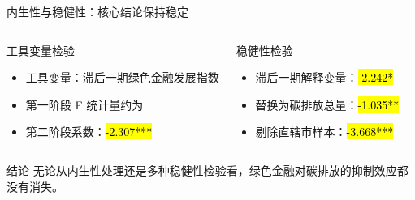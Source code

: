 \begin{frame}{内生性与稳健性：核心结论保持稳定}
  \begin{columns}[T,onlytextwidth]
    \begin{block}{工具变量检验}
      \begin{itemize}
        \item 工具变量：滞后一期绿色金融发展指数
        \item 第一阶段 F 统计量约为 
        \item 第二阶段系数：\hl{-2.307***}
      \end{itemize}
    \end{block}

    \begin{exampleblock}{稳健性检验}
      \begin{itemize}
        \item 滞后一期解释变量：\hl{-2.242*}
        \item 替换为碳排放总量：\hl{-1.035**}
        \item 剔除直辖市样本：\hl{-3.668***}
      \end{itemize}
    \end{exampleblock}
  \end{columns}

  \begin{alertblock}{结论}
    无论从内生性处理还是多种稳健性检验看，绿色金融对碳排放的抑制效应都没有消失。
  \end{alertblock}
\end{frame}
